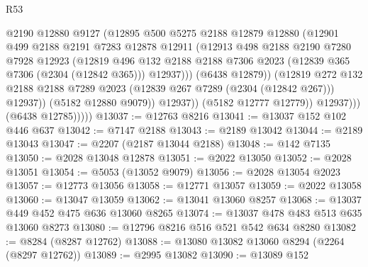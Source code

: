 \begin{lexlean}{R53}
\begin{coremodule}
                            @2190
                            @12880
                            @9127
                            (@12895
                              @500
                              @5275
                              @2188
                              @12879
                              @12880
                              (@12901
                                @499
                                @2188
                                @2191
                                @7283
                                @12878
                                @12911
                                (@12913
                                  @498
                                  @2188
                                  @2190
                                  @7280
                                  @7928
                                  @12923
                                  (@12819
                                    @496
                                    @132
                                    @2188
                                    @2188
                                    @7306
                                    @2023
                                    (@12839 @365 @7306 (@2304 (@12842 @365)))
                                    @12937)))
                              (@6438 @12879))
                            (@12819
                              @272
                              @132
                              @2188
                              @2188
                              @7289
                              @2023
                              (@12839 @267 @7289 (@2304 (@12842 @267)))
                              @12937))
                          (@5182 @12880 @9079))
                        @12937))
                    (@5182 @12777 @12779))
                  @12937)))
            (@6438 @12785)))))
@13037 := @12763 @8216
@13041 := @13037 @152 @102 @446 @637
@13042 := @7147 @2188
@13043 := @2189 @13042
@13044 := @2189 @13043
@13047 := @2207 (@2187 @13044 @2188)
@13048 := @142 @7135
@13050 := @2028 @13048 @12878
@13051 := @2022 @13050
@13052 := @2028 @13051
@13054 := @5053 (@13052 @9079)
@13056 := @2028 @13054 @2023
@13057 := @12773 @13056
@13058 := @12771 @13057
@13059 := @2022 @13058
@13060 := @13047 @13059
@13062 := @13041 @13060 @8257
@13068 := @13037 @449 @452 @475 @636 @13060 @8265
@13074 := @13037 @478 @483 @513 @635 @13060 @8273
@13080 := @12796 @8216 @516 @521 @542 @634 @8280
@13082 := @8284 (@8287 @12762)
@13088 := @13080 @13082 @13060 @8294 (@2264 (@8297 @12762))
@13089 := @2995 @13082
@13090 := @13089 @152

\end{coremodule}
\end{lexlean}
